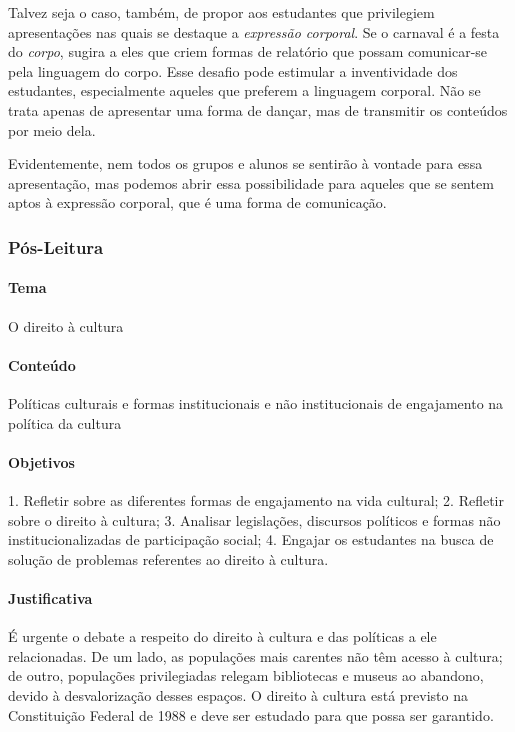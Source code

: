 \documentclass[11pt]{extarticle}
\begin{document}
Talvez seja o caso, também, de propor aos estudantes que privilegiem
apresentações nas quais se destaque a \emph{expressão corporal}. Se o
carnaval é a festa do \emph{corpo}, sugira a eles que criem formas de
relatório que possam comunicar-se pela linguagem do corpo. Esse desafio
pode estimular a inventividade dos estudantes, especialmente aqueles que
preferem a linguagem corporal. Não se trata apenas de apresentar uma
forma de dançar, mas de transmitir os conteúdos por meio dela.

Evidentemente, nem todos os grupos e alunos se sentirão à vontade para
essa apresentação, mas podemos abrir essa possibilidade para aqueles que
se sentem aptos à expressão corporal, que é uma forma de comunicação.

\subsubsection{Pós-Leitura}


\paragraph{Tema} O direito à cultura

\paragraph{Conteúdo} Políticas culturais e formas institucionais e não
institucionais de engajamento na política da cultura

\paragraph{Objetivos} 1. Refletir sobre as diferentes formas de
engajamento na vida cultural; 2. Refletir sobre o direito à cultura; 3.
Analisar legislações, discursos políticos e formas não
institucionalizadas de participação social; 4. Engajar os estudantes na
busca de solução de problemas referentes ao direito à cultura.

\paragraph{Justificativa} É urgente o debate a respeito do direito à
cultura e das políticas a ele relacionadas. De um lado, as populações
mais carentes não têm acesso à cultura; de outro, populações
privilegiadas relegam bibliotecas e museus ao abandono, devido à
desvalorização desses espaços. O direito à cultura está previsto na
Constituição Federal de 1988 e deve ser estudado para que possa ser
garantido.
\end{document}

